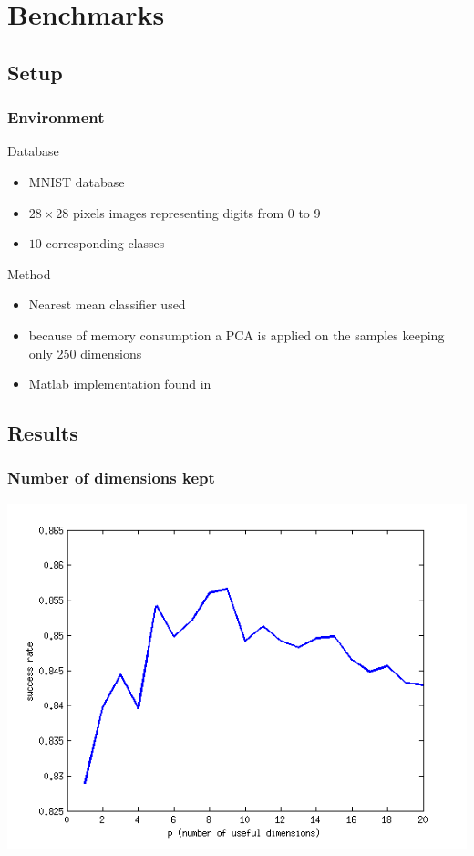 \documentclass[smaller,pdf,svgnames]{beamer}
\begin{document}
\section{Benchmarks}

\subsection{Setup}

\begin{frame}
  \frametitle{Environment}

  \begin{block}{Database}
    \begin{itemize}
      \item MNIST database
      \item $28 \times 28$ pixels images representing digits from $0$ to $9$
      \item $10$ corresponding classes
    \end{itemize}
  \end{block}

  \begin{block}{Method}
    \begin{itemize}
      \item Nearest mean classifier used
      \item because of memory consumption a PCA is applied on the samples keeping only 250 dimensions
      \item Matlab implementation found in \cite{burget.2004}
    \end{itemize}
  \end{block}

\end{frame}

\subsection{Results}

\begin{frame}
  \frametitle{Number of dimensions kept}
  \centering\includegraphics[scale=0.70]{../img/bench-classes}
\end{frame}
\end{document}
